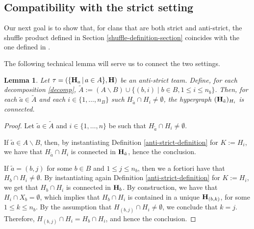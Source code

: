 \documentclass{article}
\theoremstyle{plain}
\newtheorem{lemma}[thm]{Lemma}
\theoremstyle{definition}
\newcommand{\union}{\cup}
\newcommand{\set}[1]{\{#1\}}
\newcommand{\setc}[2]{\set{#1 \mid #2}}
\newcommand{\inter}{\cap}
\newcommand{\hyper}[1]{{\bf #1}}
\begin{document}
 \subsection{Compatibility with the strict setting}\label{strict-and-antistrict-coincidence-section}
 Our next goal is to show that, for clans that are both strict and anti-strict, the shuffle product defined in Section \ref{shuffle-definition-section} coincides with the one defined in \cite{PLBJ1}.

\smallskip
 
The following technical  lemma will serve us to connect the two settings.
\begin{lemma}\label{oldway}
Let $\tau=(\{{\bf H}_a\,|\,a\in A\},{\bf H})$ be an anti-strict team. Define,  for each decomposition \eqref{decomp}, 
 $\tilde{A}:=(A\backslash B)\union\setc{(b,i)}{b\in B, 1\leq i\leq n_b}$. Then,
 for each $\tilde{a}\in \tilde{A}$  and  each $i\in\set{1,\ldots,n_B}$ such  $H_{\tilde{a}}\inter H_i\neq\emptyset$, the hypergraph $(\hyper{H}_{\tilde{a}})_{H_i}$ is connected.
\end{lemma}


\begin{proof}
Let $\tilde{a}\in \tilde{A}$ and $i\in\set{1,\ldots,n}$ be such that $H_{\tilde{a}}\inter H_i\neq\emptyset$.

If $\tilde{a}\in A\backslash B$, then, by instantiating Definition \ref{anti-strict-definition} for $K:=H_i$, we have that $H_{\tilde{a}}\cap H_i$ is connected in ${\bf H}_{\tilde{a}}$, hence the conclusion. 

If $\tilde{a}=(b,j)$  for some $b\in B$ and $1\leq j\leq n_b$, then we a fortiori have that $H_{b}\cap H_i\neq\emptyset$. By instantiating again Definition \ref{anti-strict-definition} for $K:=H_{i}$, we get that $H_{b}\cap H_i$ is connected in ${\bf H}_b$. By construction, we have that $H_i\cap X_b=\emptyset$, which implies that $H_{b}\cap H_i$ is contained in a unique ${\bf H}_{(b,k)}$, for some $1\leq k\leq n_b$. By the assumption that $H_{(b,j)}\cap H_i\neq \emptyset$, we conclude that $k=j$. Therefore, $H_{(b,j)} \cap H_i = H_b \cap H_i$, and hence the conclusion.
\end{proof}
\end{document}
